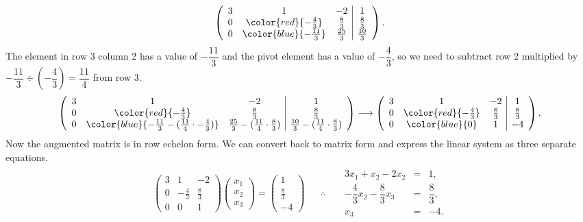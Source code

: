\documentclass[letterpaper,10pt,english]{jupyterBook}
\begin{document}
\begin{equation*}
\begin{split} \left( \begin{array}{ccc|c}
    3 & 1 & -2 & 1 \\
    0 & \color{red}{-\frac{4}{3}} & \frac{8}{3} & \frac{8}{3} \\
    0 & \color{blue}{-\frac{11}{3}} & \frac{25}{3} & \frac{10}{3}
\end{array} \right). \end{split}
\end{equation*}
\sphinxAtStartPar
The element in row 3 column 2 has a value of \(-\dfrac{11}{3}\) and the pivot element has a value of \(-\dfrac{4}{3}\), so we need to subtract row 2 multiplied by \(-\dfrac{11}{3} \div \left(-\dfrac{4}{3}\right) = \dfrac{11}{4}\) from row 3.
\begin{equation*}
\begin{split} \left( \begin{array}{ccc|c}
    3 & 1 & -2 & 1 \\
    0 & \color{red}{-\frac{4}{3}} & \frac{8}{3} & \frac{8}{3} \\
    0 & \color{blue}{-\frac{11}{3} - (\frac{11}{4}\cdot -\frac{4}{3})} & \frac{25}{3} - (\frac{11}{4}\cdot \frac{8}{3}) & \frac{10}{3} - (\frac{11}{4}\cdot \frac{8}{3})
\end{array} \right)
\longrightarrow
\left( \begin{array}{ccc|c}
    3 & 1 & -2 & 1 \\
    0 & \color{red}{-\frac{4}{3}} & \frac{8}{3} & \frac{8}{3} \\
    0 & \color{blue}{0} & 1 & -4
\end{array} \right). \end{split}
\end{equation*}
\sphinxAtStartPar
Now the augmented matrix is in row echelon form. We can convert back to matrix form and express the linear system as three separate equations.
\begin{equation*}
\begin{split} \begin{align*}
  \begin{pmatrix}
      3 & 1 & -2 \\
      0 & -\frac{4}{3} & \frac{8}{3} \\
      0 & 0 & 1
  \end{pmatrix}
  \begin{pmatrix} x_1 \\ x_2 \\ x_3 \end{pmatrix} 
  = \begin{pmatrix} 1 \\ \frac{8}{3} \\ -4 \end{pmatrix}  
  && \therefore &&
  \begin{array}{rcl}
      3 x_1 + x_2 - 2 x_2 &=& 1, \\
      -\dfrac{4}{3} x_2 - \dfrac{8}{3} x_3 &=& \dfrac{8}{3}, \\
      x_3 &=& -4.
  \end{array}
\end{align*} \end{split}
\end{equation*}
\end{document}
